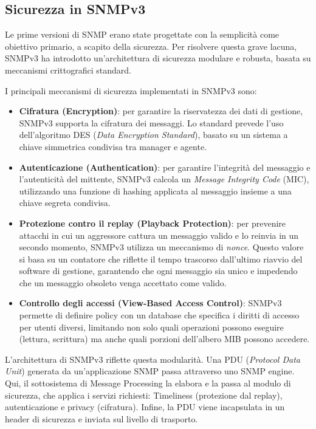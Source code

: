 \subsection{Sicurezza in SNMPv3}

Le prime versioni di SNMP erano state progettate con la semplicità come obiettivo
primario, a scapito della sicurezza. Per risolvere questa grave lacuna,
SNMPv3 ha introdotto un'architettura di sicurezza modulare e robusta, basata su
meccanismi crittografici standard.

I principali meccanismi di sicurezza implementati in SNMPv3 sono:

\begin{itemize}
\item \textbf{Cifratura (Encryption)}: per garantire la riservatezza dei dati
di gestione, SNMPv3 supporta la cifratura dei messaggi. Lo standard prevede
l'uso dell'algoritmo DES (\textit{Data Encryption Standard}), basato su un
sistema a chiave simmetrica condivisa tra manager e agente.
\item \textbf{Autenticazione (Authentication)}: per garantire l'integrità del
messaggio e l'autenticità del mittente, SNMPv3 calcola un
\textit{Message Integrity Code} (MIC), utilizzando una funzione di hashing
applicata al messaggio insieme a una chiave segreta condivisa.
\item \textbf{Protezione contro il replay (Playback Protection)}: per prevenire
attacchi in cui un aggressore cattura un messaggio valido e lo reinvia in un
secondo momento, SNMPv3 utilizza un meccanismo di \textit{nonce}. Questo
valore si basa su un contatore che riflette il tempo trascorso dall'ultimo
riavvio del software di gestione, garantendo che ogni messaggio sia unico e
impedendo che un messaggio obsoleto venga accettato come valido.
\item \textbf{Controllo degli accessi (View-Based Access Control)}: SNMPv3
permette di definire policy con un database che specifica i diritti 
di accesso per utenti diversi, limitando non solo quali operazioni possono 
eseguire (lettura, scrittura) ma anche quali porzioni dell'albero MIB
possono accedere.
\end{itemize}

L'architettura di SNMPv3 riflette questa modularità. Una PDU
(\textit{Protocol Data Unit}) generata da un'applicazione SNMP passa attraverso
uno SNMP engine. Qui, il sottosistema di Message Processing la elabora e la
passa al modulo di sicurezza, che applica i servizi richiesti: Timeliness
(protezione dal replay), autenticazione e privacy (cifratura). Infine, la PDU
viene incapsulata in un header di sicurezza e inviata sul livello di trasporto.

